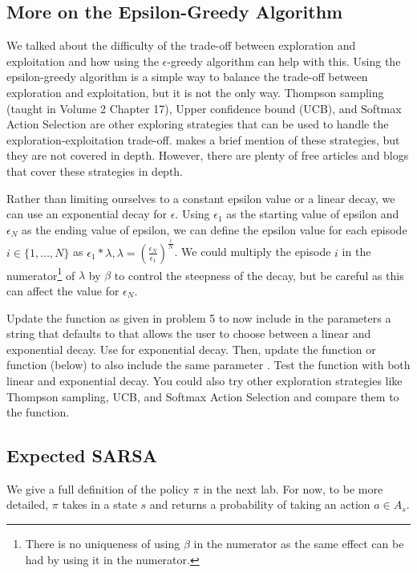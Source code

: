 \subsection*{More on the Epsilon-Greedy Algorithm}
We talked about the difficulty of the trade-off between exploration and exploitation and how using the $\epsilon$-greedy algorithm can help with this.
Using the epsilon-greedy algorithm is a simple way to balance the trade-off between exploration and exploitation, but it is not the only way.
Thompson sampling (taught in Volume 2 Chapter 17), Upper confidence bound (UCB), and Softmax Action Selection are other exploring strategies that can be used to handle the exploration-exploitation trade-off.
\cite{sutton2018reinforcement} makes a brief mention of these strategies, but they are not covered in depth.
However, there are plenty of free articles and blogs that cover these strategies in depth.

Rather than limiting ourselves to a constant epsilon value or a linear decay, we can use an exponential decay for $\epsilon$.
Using $\epsilon_1$ as the starting value of epsilon and $\epsilon_N$ as the ending value of epsilon, we can define the epsilon value for each episode $i\in\{1,\ldots,N\}$ as $\epsilon_1 * \lambda, \lambda=(\frac{\epsilon_N}{\epsilon_1})^{\frac{i}{N}}$.
We could multiply the episode $i$ in the numerator\footnote{There is no uniqueness of using $\beta$ in the numerator as the same effect can be had by using it in the numerator.} of $\lambda$ by $\beta$ to control the steepness of the decay, but be careful as this can affect the value for $\epsilon_N$.

\begin{problem}
    Update the function  as given in problem 5 to now include in the parameters a string  that defaults to  that allows the user to choose between a linear and exponential decay.
    Use  for exponential decay.
    Then, update the  function or  function (below) to also include the same parameter .
    Test the function with both linear and exponential decay.
    You could also try other exploration strategies like Thompson sampling, UCB, and Softmax Action Selection and compare them to the  function.
\end{problem}

\subsection*{Expected SARSA}
We give a full definition of the policy $\pi$ in the next lab.
For now, to be more detailed, $\pi$ takes in a state $s$ and returns a probability of taking an action $a\in A_s$.

